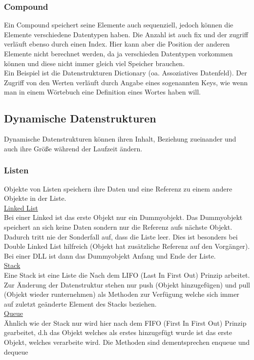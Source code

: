 \documentclass[a4paper]{scrartcl}
\begin{document}
            \subsubsection*{Compound}
                Ein Compound speichert seine Elemente auch sequenziell, jedoch können die Elemente verschiedene Datentypen haben. Die Anzahl ist auch fix und der zugriff verläuft ebenso durch einen Index.
                Hier kann aber die Position der anderen Elemente nicht berechnet werden, da ja verschieden Datentypen vorkommen können und diese nicht immer gleich viel Speicher brauchen. \\
                Ein Beispiel ist die Datenstrukturen Dictionary (oa. Assoziatives Datenfeld). Der Zugriff von den Werten verläuft durch Angabe eines sogenannten Keys, wie wenn man in einem Wörtebuch 
                eine Definition eines Wortes haben will. 
            
        \subsection{Dynamische Datenstrukturen}
            Dynamische Datenstrukturen können ihren Inhalt, Beziehung zueinander und auch ihre Größe während der Laufzeit ändern.
            
            \subsubsection*{Listen}  
            Objekte von Listen speichern ihre Daten und eine Referenz zu einem andere Objekte in der Liste. \\            
            \underline{Linked List} \hfill \\
            Bei einer Linked ist das erste Objekt nur ein Dummyobjekt. Das Dummyobjekt speichert an sich  keine Daten sondern nur die Referenz aufs nächste Objekt.
            Dadurch tritt nie der Sonderfall auf, dass die Liste leer. Dies ist besonders bei Double Linked List hilfreich (Objekt hat zusätzliche Referenz auf
            den Vorgänger). Bei einer DLL ist dann das Dummyobjekt Anfang und Ende der Liste.\\
            \underline{Stack} \hfill \\
            Eine Stack ist eine Liste die Nach dem LIFO (Last In First Out) Prinzip arbeitet. Zur Änderung der Datenstruktur stehen nur push (Objekt hinzugefügen) und  pull (Objekt wieder runternehmen)
            als Methoden zur Verfügung welche sich immer auf zuletzt geänderte Element des Stacks beziehen. \\
            \underline{Queue} \hfill \\
            Ähnlich wie der Stack nur wird hier nach dem FIFO (First In First Out) Prinzip gearbeitet, d.h das Objekt welches als erstes hinzugefügt wurde ist das erste Objekt, welches 
            verarbeite wird. Die Methoden sind dementsprechen enqueue und dequeue 
\end{document}
